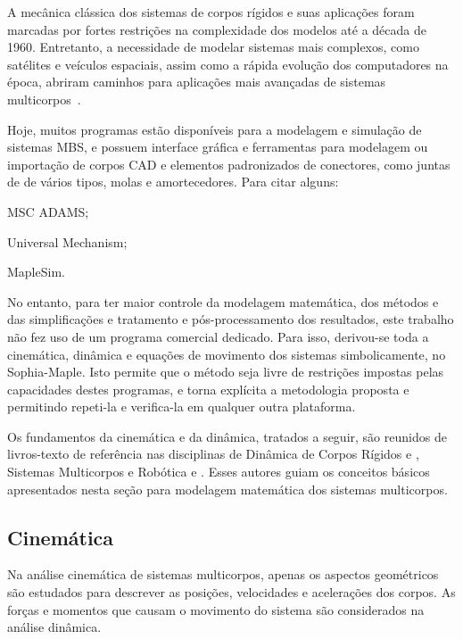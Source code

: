 A mecânica clássica dos sistemas de corpos rígidos e suas aplicações foram
marcadas por fortes restrições na complexidade dos modelos até a década de 1960.
Entretanto, a necessidade de modelar sistemas mais complexos, como satélites e
veículos espaciais, assim como a rápida evolução dos computadores na época,
abriram caminhos para aplicações mais avançadas de sistemas
multicorpos~\cite{schiehlen1997multibody}.

Hoje, muitos programas estão disponíveis para a modelagem e simulação de
sistemas MBS, e possuem interface gráfica e ferramentas para modelagem ou
importação de corpos CAD e elementos padronizados de conectores, como juntas de
de vários tipos, molas e amortecedores. Para citar alguns:
%
\begin{enumerate*}[label=\emph{\roman*})]
	\item MSC ADAMS;
	\item Universal Mechanism;
	\item MapleSim.
\end{enumerate*}
%

No entanto, para ter maior controle da modelagem matemática, dos métodos e das
simplificações e tratamento e pós-processamento dos resultados, este trabalho
não fez uso de um programa comercial dedicado. Para isso, derivou-se toda a
cinemática, dinâmica e equações de movimento dos sistemas simbolicamente, no
Sophia-Maple. Isto permite que o método seja livre de restrições impostas pelas
capacidades destes programas, e torna explícita a metodologia proposta e
permitindo repeti-la e verifica-la em qualquer outra plataforma.

Os fundamentos da cinemática e da dinâmica, tratados a seguir, são reunidos de
livros-texto de referência nas disciplinas de Dinâmica de Corpos Rígidos
\cite{tenenbaum2006fundamentals} e \cite{kane1985dynamics}, Sistemas Multicorpos
\cite{shabana2013dynamics} e Robótica \cite{sciavicco2012modelling} e
\cite{spong2006robot}. Esses autores guiam os conceitos básicos apresentados
nesta seção para modelagem matemática dos sistemas multicorpos.


\subsection{Cinemática}\label{sec::cinematica}

Na análise cinemática de sistemas multicorpos, apenas os aspectos geométricos
são estudados para descrever as posições, velocidades e acelerações dos corpos.
As forças e momentos que causam o movimento do sistema são considerados na
análise dinâmica.


